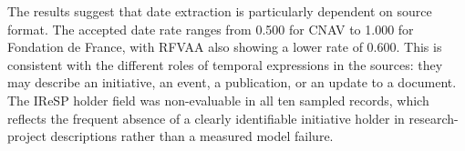 The results suggest that date extraction is particularly dependent on source
format. The accepted date rate ranges from 0.500 for CNAV to 1.000 for
Fondation de France, with RFVAA also showing a lower rate of 0.600. This is
consistent with the different roles of temporal expressions in the sources:
they may describe an initiative, an event, a publication, or an update to a
document. The IReSP holder field was non-evaluable in all ten sampled records,
which reflects the frequent absence of a clearly identifiable initiative holder
in research-project descriptions rather than a measured model failure.
